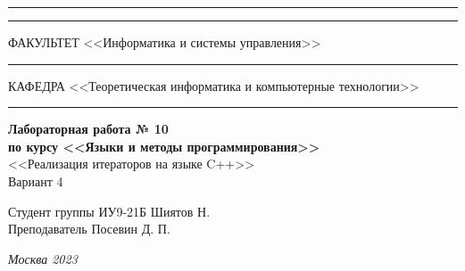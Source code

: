 \documentclass[a4paper, 14pt]{extarticle}
\begin{document}
\begin{titlepage}
\vspace{-25pt}
\hspace{-35pt}\rule{\textwidth}{2.3pt}

\vspace*{-20.3pt}
\hspace{-35pt}\rule{\textwidth}{0.4pt}

\vspace{1.5ex}
\hspace{-35pt} \noindent \small ФАКУЛЬТЕТ\hspace{80pt} <<Информатика и системы управления>>

\vspace*{-16pt}
\hspace{47pt}\rule{0.83\textwidth}{0.4pt}

\vspace{0.5ex}
\hspace{-35pt} \noindent \small КАФЕДРА\hspace{50pt} <<Теоретическая информатика и компьютерные технологии>>

\vspace*{-16pt}
\hspace{30pt}\rule{0.866\textwidth}{0.4pt}
  
\vspace{11em}

\begin{center}
\Large {\bf Лабораторная работа № 10} \\ 
\large {\bf по курсу <<Языки и методы программирования>>} \\
\large <<Реализация итераторов на языке C++>> \\
\Large Вариант 4
\end{center}\normalsize

\vspace{8em}


\begin{flushright}
  {Студент группы ИУ9-21Б Шиятов Н. \hspace*{15pt}\\ 
  \vspace{2ex}
  Преподаватель Посевин Д. П.\hspace*{15pt}}
\end{flushright}

\bigskip

\vfill
 

\begin{center}
\textsl{Москва 2023}
\end{center}
\end{titlepage}
\end{document}
